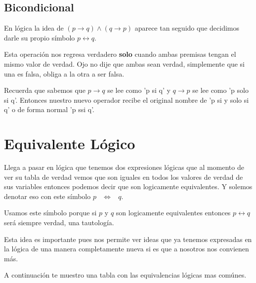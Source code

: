 \documentclass[12pt]{report}                                    %
\DeclareMathOperator \Space {\quad}                             %
\DeclareMathOperator \MiniSpace {\;}                            %
\DeclareMathOperator \doublearrow {\leftrightarrow}             %
\newcommand \lequal {\MiniSpace \Leftrightarrow \MiniSpace}     %
\begin{document}
        \clearpage
        \subsection{Bicondicional}

            En lógica la idea de $(p \to q ) \land (q \to p)$ aparece tan seguido que decidimos darle su
            propio símbolo $p \doublearrow q$.

            Esta operación nos regresa verdadero \textbf{solo} cuando ambas premisas tengan el mismo valor de
            verdad. Ojo no dije que ambas sean verdad, simplemente que si una es falsa, obliga a la otra a 
            ser falsa.

            Recuerda que sabemos que $p \to q$ se lee como 'p si q' y $q \to p$ se lee como 'p solo si q'.
            Entonces nuestro nuevo operador recibe el original nombre de 'p si y solo si q' o de forma normal
            'p ssi q'.



    \section{Equivalente Lógico}

        Llega a pasar en lógica que tenemos dos expresiones lógicas que al momento de ver su tabla de 
        verdad vemos que son iguales en todos los valores de verdad de sus variables entonces podemos
        decir que son logicamente equivalentes. Y solemos denotar eso con este símbolo $p \lequal q$.

        Usamos este símbolo porque si $p$ y $q$ son logicamente equivalentes entonces $p \doublearrow q$
        será siempre verdad, una tautología.

        Esta idea es importante pues nos permite ver ideas que ya tenemos expresadas en la lógica de una
        manera completamente nueva si es que a nosotros nos convienen más.

        A continuación te muestro una tabla con las equivalencias lógicas mas comúnes.






    \clearpage
\end{document}
